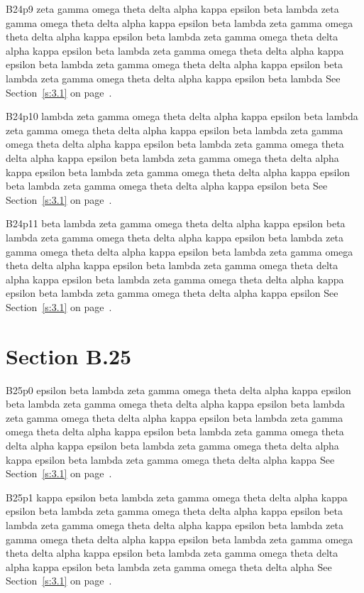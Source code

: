 B24p9 zeta gamma omega theta delta alpha kappa epsilon beta lambda zeta gamma omega theta delta alpha kappa epsilon beta lambda zeta gamma omega theta delta alpha kappa epsilon beta lambda zeta gamma omega theta delta alpha kappa epsilon beta lambda zeta gamma omega theta delta alpha kappa epsilon beta lambda zeta gamma omega theta delta alpha kappa epsilon beta lambda zeta gamma omega theta delta alpha kappa epsilon beta lambda See Section~\ref{s:3.1} on page~\pageref{s:3.1}.

B24p10 lambda zeta gamma omega theta delta alpha kappa epsilon beta lambda zeta gamma omega theta delta alpha kappa epsilon beta lambda zeta gamma omega theta delta alpha kappa epsilon beta lambda zeta gamma omega theta delta alpha kappa epsilon beta lambda zeta gamma omega theta delta alpha kappa epsilon beta lambda zeta gamma omega theta delta alpha kappa epsilon beta lambda zeta gamma omega theta delta alpha kappa epsilon beta See Section~\ref{s:3.1} on page~\pageref{s:3.1}.

B24p11 beta lambda zeta gamma omega theta delta alpha kappa epsilon beta lambda zeta gamma omega theta delta alpha kappa epsilon beta lambda zeta gamma omega theta delta alpha kappa epsilon beta lambda zeta gamma omega theta delta alpha kappa epsilon beta lambda zeta gamma omega theta delta alpha kappa epsilon beta lambda zeta gamma omega theta delta alpha kappa epsilon beta lambda zeta gamma omega theta delta alpha kappa epsilon See Section~\ref{s:3.1} on page~\pageref{s:3.1}.

\section{Section B.25}\label{s:B.25}
B25p0 epsilon beta lambda zeta gamma omega theta delta alpha kappa epsilon beta lambda zeta gamma omega theta delta alpha kappa epsilon beta lambda zeta gamma omega theta delta alpha kappa epsilon beta lambda zeta gamma omega theta delta alpha kappa epsilon beta lambda zeta gamma omega theta delta alpha kappa epsilon beta lambda zeta gamma omega theta delta alpha kappa epsilon beta lambda zeta gamma omega theta delta alpha kappa See Section~\ref{s:3.1} on page~\pageref{s:3.1}.

B25p1 kappa epsilon beta lambda zeta gamma omega theta delta alpha kappa epsilon beta lambda zeta gamma omega theta delta alpha kappa epsilon beta lambda zeta gamma omega theta delta alpha kappa epsilon beta lambda zeta gamma omega theta delta alpha kappa epsilon beta lambda zeta gamma omega theta delta alpha kappa epsilon beta lambda zeta gamma omega theta delta alpha kappa epsilon beta lambda zeta gamma omega theta delta alpha See Section~\ref{s:3.1} on page~\pageref{s:3.1}.

